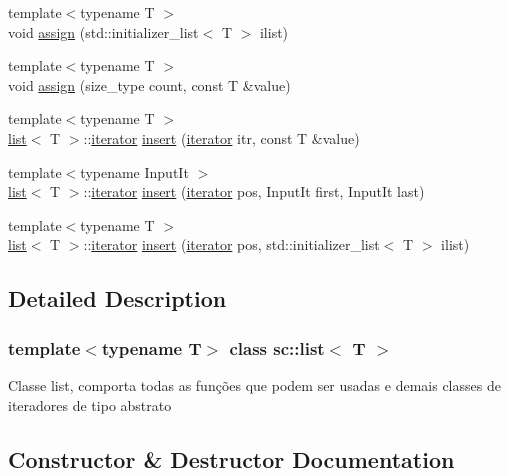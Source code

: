 \begin{DoxyCompactItemize}
\item 
{\footnotesize template$<$typename T $>$ }\\void \mbox{\hyperlink{classsc_1_1list_a4aa5ed764ec08bf8250d5dc65df8d4a5}{assign}} (std\+::initializer\+\_\+list$<$ T $>$ ilist)
\item 
{\footnotesize template$<$typename T $>$ }\\void \mbox{\hyperlink{classsc_1_1list_ac1e81764b779171186a3970cb1b3d288}{assign}} (size\+\_\+type count, const T \&value)
\item 
{\footnotesize template$<$typename T $>$ }\\\mbox{\hyperlink{classsc_1_1list}{list}}$<$ T $>$\+::\mbox{\hyperlink{classsc_1_1list_1_1iterator}{iterator}} \mbox{\hyperlink{classsc_1_1list_a31f318aea55ddfb39b23370c3a609400}{insert}} (\mbox{\hyperlink{classsc_1_1list_1_1iterator}{iterator}} itr, const T \&value)
\item 
{\footnotesize template$<$typename Input\+It $>$ }\\\mbox{\hyperlink{classsc_1_1list}{list}}$<$ T $>$\+::\mbox{\hyperlink{classsc_1_1list_1_1iterator}{iterator}} \mbox{\hyperlink{classsc_1_1list_ad26f50a102e4f66e4d0771bd602fa5f8}{insert}} (\mbox{\hyperlink{classsc_1_1list_1_1iterator}{iterator}} pos, Input\+It first, Input\+It last)
\item 
{\footnotesize template$<$typename T $>$ }\\\mbox{\hyperlink{classsc_1_1list}{list}}$<$ T $>$\+::\mbox{\hyperlink{classsc_1_1list_1_1iterator}{iterator}} \mbox{\hyperlink{classsc_1_1list_a08e432de3c38c6e770e9c6de2f0782e2}{insert}} (\mbox{\hyperlink{classsc_1_1list_1_1iterator}{iterator}} pos, std\+::initializer\+\_\+list$<$ T $>$ ilist)
\end{DoxyCompactItemize}


\subsection{Detailed Description}
\subsubsection*{template$<$typename T$>$\newline
class sc\+::list$<$ T $>$}

Classe list, comporta todas as funções que podem ser usadas e demais classes de iteradores de tipo abstrato 

\subsection{Constructor \& Destructor Documentation}
\mbox{\label{classsc_1_1list_ac7b95807230114dc58f2b1156cb3cdba}} 

